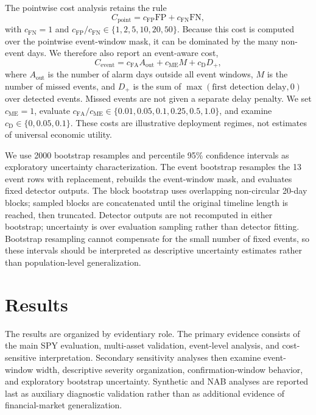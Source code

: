 \documentclass[10pt,twocolumn]{article}
\begin{document}
The pointwise cost analysis retains the rule
\begin{equation}
C_{\mathrm{point}}=c_{\mathrm{FP}}\mathrm{FP}+c_{\mathrm{FN}}\mathrm{FN},
\end{equation}
with $c_{\mathrm{FN}}=1$ and $c_{\mathrm{FP}}/c_{\mathrm{FN}}\in\{1,2,5,10,20,50\}$. Because this cost is computed over the pointwise event-window mask, it can be dominated by the many non-event days. We therefore also report an event-aware cost,
\begin{equation}
C_{\mathrm{event}}=c_{\mathrm{FA}}A_{\mathrm{out}}+c_{\mathrm{ME}}M+c_{\mathrm{D}}D_+,
\end{equation}
where $A_{\mathrm{out}}$ is the number of alarm days outside all event windows, $M$ is the number of missed events, and $D_+$ is the sum of $\max(\text{first detection delay},0)$ over detected events. Missed events are not given a separate delay penalty. We set $c_{\mathrm{ME}}=1$, evaluate $c_{\mathrm{FA}}/c_{\mathrm{ME}}\in\{0.01,0.05,0.1,0.25,0.5,1.0\}$, and examine $c_{\mathrm{D}}\in\{0,0.05,0.1\}$. These costs are illustrative deployment regimes, not estimates of universal economic utility.

We use 2000 bootstrap resamples and percentile 95\% confidence intervals as exploratory uncertainty characterization. The event bootstrap resamples the 13 event rows with replacement, rebuilds the event-window mask, and evaluates fixed detector outputs. The block bootstrap uses overlapping non-circular 20-day blocks; sampled blocks are concatenated until the original timeline length is reached, then truncated. Detector outputs are not recomputed in either bootstrap; uncertainty is over evaluation sampling rather than detector fitting. Bootstrap resampling cannot compensate for the small number of fixed events, so these intervals should be interpreted as descriptive uncertainty estimates rather than population-level generalization.

\section{Results}
The results are organized by evidentiary role. The primary evidence consists of the main SPY evaluation, multi-asset validation, event-level analysis, and cost-sensitive interpretation. Secondary sensitivity analyses then examine event-window width, descriptive severity organization, confirmation-window behavior, and exploratory bootstrap uncertainty. Synthetic and NAB analyses are reported last as auxiliary diagnostic validation rather than as additional evidence of financial-market generalization.
\end{document}

